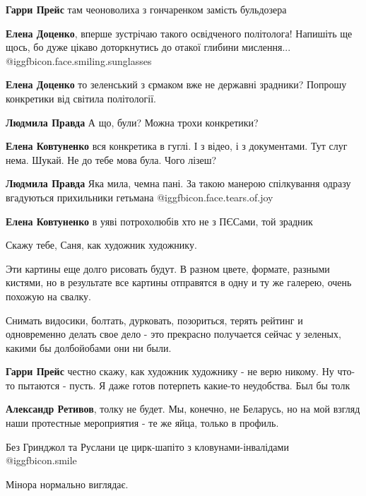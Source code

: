 \begin{itemize}
\begin{itemize}
\textbf{Гарри Прейс} там чеоноволиха з гончаренком замість бульдозера

\textbf{Елена Доценко}, вперше зустрічаю такого освідченого політолога!
Напишіть ще щось, бо дуже цікаво доторкнутись до отакої глибини мислення...  @igg{fbicon.face.smiling.sunglasses} 

\textbf{Елена Доценко} то зеленський з єрмаком вже не державні зрадники? Попрошу конкретики від світила політології.

\textbf{Людмила Правда} А що, були? Можна трохи конкретики?

\textbf{Елена Ковтуненко} вся конкретика в гуглі. І з відео, і з документами. Тут слуг нема. Шукай. Не до тебе мова була. Чого лізеш?

\textbf{Людмила Правда} Яка мила, чемна пані. За такою манерою спілкування одразу вгадуються прихильники гетьмана  @igg{fbicon.face.tears.of.joy} 

\textbf{Елена Ковтуненко} в уяві потрохолюбів хто не з ПЄСами, той зрадник
\end{itemize} %


Скажу тебе, Саня, как художник художнику.

Эти картины еще долго рисовать будут. В разном цвете, формате, разными кистями,
но в результате все картины отправятся в одну и ту же галерею, очень похожую на
свалку.

Снимать видосики, болтать, дурковать, позориться, терять рейтинг и одновременно
делать свое дело - это прекрасно получается сейчас у зеленых, какими бы
долбойобами они ни были.

\begin{itemize} %
\textbf{Гарри Прейс} честно скажу, как художник художнику - не верю никому. Ну что-то пытаются - пусть. Я даже готов потерпеть какие-то неудобства. Был бы толк

\textbf{Александр Ретивов}, толку не будет.
Мы, конечно, не Беларусь, но на мой взгляд наши протестные мероприятия - те же яйца, только в профиль.
\end{itemize} %

Без Гринджол та Руслани це цирк-шапіто з кловунами-інвалідами  @igg{fbicon.smile} 

Мінора нормально виглядає.


\end{itemize}
